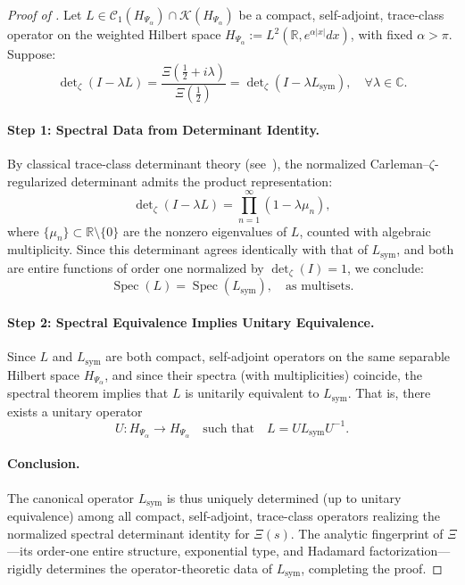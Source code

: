 \begin{proof}[Proof of ]
Let \( L \in \mathcal{C}_1(H_{\Psi_\alpha}) \cap \mathcal{K}(H_{\Psi_\alpha}) \) be a compact, self-adjoint, trace-class operator on the weighted Hilbert space \( H_{\Psi_\alpha} := L^2(\mathbb{R}, e^{\alpha|x|}dx) \), with fixed \( \alpha > \pi \). Suppose:
\[
\det\nolimits_\zeta(I - \lambda L) = \frac{\Xi\left(\tfrac{1}{2} + i\lambda\right)}{\Xi\left(\tfrac{1}{2}\right)}
= \det\nolimits_\zeta(I - \lambda L_{\mathrm{sym}}),
\quad \forall \lambda \in \mathbb{C}.
\]

\paragraph{Step 1: Spectral Data from Determinant Identity.}
By classical trace-class determinant theory (see~\cite[Thm. 4.2]{Simon2005TraceIdeals}), the normalized Carleman–\(\zeta\)-regularized determinant admits the product representation:
\[
\det\nolimits_\zeta(I - \lambda L)
= \prod_{n=1}^\infty (1 - \lambda \mu_n),
\]
where \( \{ \mu_n \} \subset \mathbb{R} \setminus \{0\} \) are the nonzero eigenvalues of \( L \), counted with algebraic multiplicity. Since this determinant agrees identically with that of \( L_{\mathrm{sym}} \), and both are entire functions of order one normalized by \( \det\nolimits_\zeta(I) = 1 \), we conclude:
\[
\operatorname{Spec}(L) = \operatorname{Spec}(L_{\mathrm{sym}}),
\quad \text{as multisets}.
\]

\paragraph{Step 2: Spectral Equivalence Implies Unitary Equivalence.}
Since \( L \) and \( L_{\mathrm{sym}} \) are both compact, self-adjoint operators on the same separable Hilbert space \( H_{\Psi_\alpha} \), and since their spectra (with multiplicities) coincide, the spectral theorem implies that \( L \) is unitarily equivalent to \( L_{\mathrm{sym}} \). That is, there exists a unitary operator
\[
U \colon H_{\Psi_\alpha} \to H_{\Psi_\alpha}
\quad \text{such that} \quad
L = U L_{\mathrm{sym}} U^{-1}.
\]

\paragraph{Conclusion.}
The canonical operator \( L_{\mathrm{sym}} \) is thus uniquely determined (up to unitary equivalence) among all compact, self-adjoint, trace-class operators realizing the normalized spectral determinant identity for \( \Xi(s) \). The analytic fingerprint of \( \Xi \)—its order-one entire structure, exponential type, and Hadamard factorization—rigidly determines the operator-theoretic data of \( L_{\mathrm{sym}} \), completing the proof.
\end{proof}
